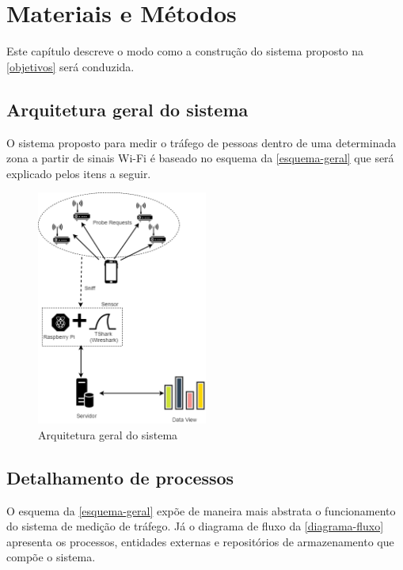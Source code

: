 
\chapter{Materiais e Métodos}
\label{metodologia}
Este capítulo descreve o modo como a construção do sistema proposto na \autoref{objetivos} será conduzida.

\section{Arquitetura geral do sistema}
O sistema proposto para medir o tráfego de pessoas dentro de uma determinada zona a partir de sinais Wi-Fi é baseado no esquema da \autoref{esquema-geral} que será explicado pelos itens a seguir.

\begin{figure}[!h]
  \caption{\label{esquema-geral}Arquitetura geral do sistema}
  \begin{center}
    \includegraphics[width=0.50\textwidth]{img/esquema_geral.png}
  \end{center}
\end{figure}

\section{Detalhamento de processos}
O esquema da \autoref{esquema-geral} expõe de maneira mais abstrata o funcionamento do sistema de medição de tráfego. Já o diagrama de fluxo da \autoref{diagrama-fluxo} apresenta os processos, entidades externas e repositórios de armazenamento que compõe o sistema. 

